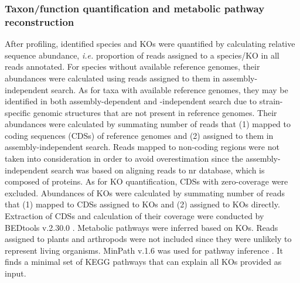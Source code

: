 \documentclass[11pt]{article}
\begin{document}
      \subsubsection{Taxon/function quantification and metabolic pathway reconstruction}
      After profiling, identified species and KOs were quantified by calculating relative sequence abundance, \textit{i.e.} proportion of reads assigned to a species/KO in all reads annotated. 
      For species without available reference genomes, their abundances were calculated using reads assigned to them in assembly-independent search. 
      As for taxa with available reference genomes, they may be identified in both assembly-dependent and -independent search due to strain-specific genomic structures that are not present in reference genomes. 
      Their abundances were calculated by summating number of reads that (1) mapped to coding sequences (CDSs) of reference genomes and (2) assigned to them in assembly-independent search. 
      Reads mapped to non-coding regions were not taken into consideration in order to avoid overestimation since the assembly-independent search was based on aligning reads to nr database, which is composed of proteins. 
      As for KO quantification, CDSs with zero-coverage were excluded. 
      Abundances of KOs were calculated by summating number of reads that (1) mapped to CDSs assigned to KOs and (2) assigned to KOs directly. 
      Extraction of CDSs and calculation of their coverage were conducted by BEDtools v.2.30.0 \citep{quinlan2010bedtools}.
      \newline
      Metabolic pathways were inferred based on KOs. 
      Reads assigned to plants and arthropods were not included since they were unlikely to represent living organisms. 
      MinPath v.1.6 was used for pathway inference \citep{ye2009parsimony}. 
      It finds a minimal set of KEGG pathways that can explain all KOs provided as input. 
\end{document}
